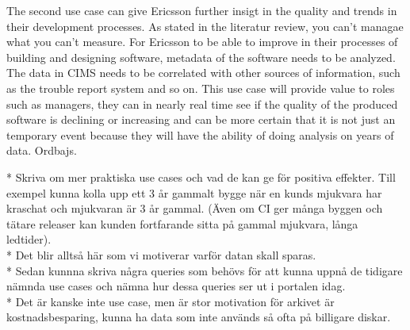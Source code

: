 The second use case can give Ericsson further insigt in the quality and trends in their development processes. As stated in the literatur review, you can't managae what you can't measure. For Ericsson to be able to improve in their processes of building and designing software, metadata of the software needs to be analyzed. The data in CIMS needs to be correlated with other sources of information, such as the trouble report system and so on. This use case will provide value to roles such as managers, they can in nearly real time see if the quality of the produced software is declining or increasing and can be more certain that it is not just an temporary event because they will have the ability of doing analysis on years of data. Ordbajs.




* Skriva om mer praktiska use cases och vad de kan ge för positiva effekter. Till exempel kunna kolla upp ett 3 år gammalt bygge när en kunds mjukvara har kraschat och mjukvaran är 3 år gammal. (Även om CI ger många byggen och tätare releaser kan kunden fortfarande sitta på gammal mjukvara, långa ledtider). \\
* Det blir alltså här som vi motiverar varför datan skall sparas.\\
* Sedan kunnna skriva några queries som behövs för att kunna uppnå de tidigare nämnda use cases och nämna hur dessa queries ser ut i portalen idag.\\
* Det är kanske inte use case, men är stor motivation för arkivet är kostnadsbesparing, kunna ha data som inte används så ofta på billigare diskar. \\




